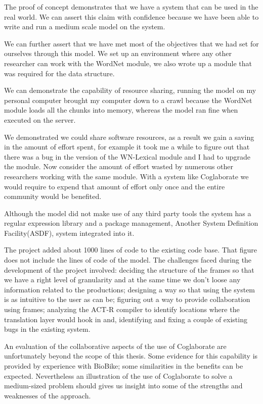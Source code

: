 The proof of concept demonstrates that we have a system that can be
used in the real world. We can assert this claim with confidence
because we have been able to write and run a medium scale model on the
system. 

We can further assert that we have met most of the objectives that we
had set for ourselves through this model. We set up an environment
where any other researcher can work with the WordNet module, we also
wrote up a module that was required for the data structure. 

We can demonstrate the capability of resource sharing, running the
model on my personal computer brought my computer down to a crawl
because the WordNet module loads all the chunks into memory, whereas
the model ran fine when executed on the server.

We demonstrated we could share software resources, as a result we gain
a saving in the amount of effort spent, for example it took me a while
to figure out that there was a bug in the version of the
WN-Lexical module and I had to upgrade the module. Now consider
the amount of effort wasted by numerous other researchers working with
the same module. With a system like Coglaborate we would require to
expend that amount of effort only once and the entire community would
be benefited.

Although the model did not make use of any third party tools the
system has a regular expression library and a package management,
Another System Definition Facility(ASDF), system integrated into it.

The project added about 1000 lines of code to the existing code
base. That figure does not include the lines of code of the model. The
challenges faced during the development of the project involved:
deciding the structure of the frames so that we have a right level of
granularity and at the same time we don't loose any information
related to the productions; designing a way so that using the system
is as intuitive to the user as can be; figuring out a way to provide
collaboration using frames; analyzing the ACT-R compiler to identify
locations where the translation layer would hook in and, identifying
and fixing a couple of existing bugs in the existing system.

An evaluation of the collaborative aspects of the use of Coglaborate
are unfortunately beyond the scope of this thesis.  Some evidence for
this capability is provided by experience with BioBike; some
similarities in the benefits can be expected.  Nevertheless an
illustration of the use of Coglaborate to solve a medium-sized problem
should gives us insight into some of the strengths and weaknesses of
the approach.







